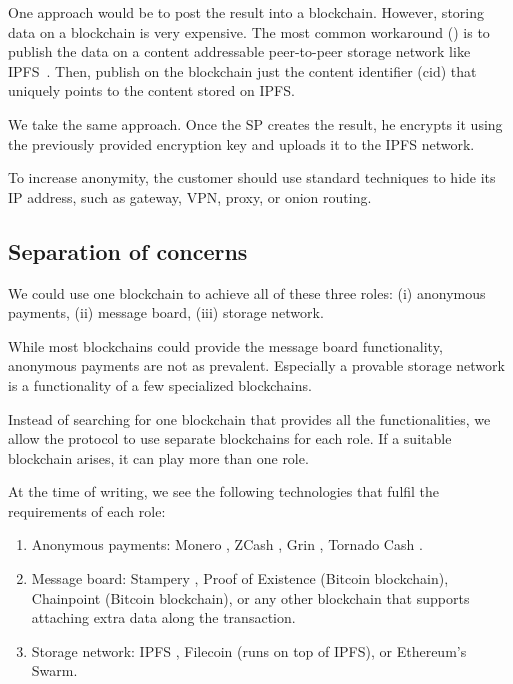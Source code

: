 \documentclass{ieeeaccess}
\begin{document}
One approach would be to post the result into a blockchain. However, storing data on a blockchain is very expensive. The most common workaround (\cite{shahidBlockchainBasedAgriFoodSupply2020, wangAuditableProtocolsFair2019, chenImprovedP2PFile2017}) is to publish the data on a content addressable peer-to-peer storage network like IPFS~\cite{benetIPFSContentAddressed2014}. Then, publish on the blockchain just the content identifier ($\mathrm{cid}$) that uniquely points to the content stored on IPFS.

We take the same approach. Once the SP creates the result, he encrypts it using the previously provided encryption key and uploads it to the IPFS network.

To increase anonymity, the customer should use standard techniques to hide its IP address, such as gateway, VPN, proxy, or onion routing.

\subsection{Separation of concerns}
We could use one blockchain to achieve all of these three roles: (i) anonymous payments, (ii) message board, (iii) storage network.

While most blockchains could provide the message board functionality, anonymous payments are not as prevalent. Especially a provable storage network is a functionality of a few specialized blockchains.

Instead of searching for one blockchain that provides all the functionalities, we allow the protocol to use separate blockchains for each role. If a suitable blockchain arises, it can play more than one role.

At the time of writing, we see the following technologies that fulfil the requirements of each role:

\begin{enumerate}
\def\labelenumi{\arabic{enumi}.}

\item Anonymous payments: Monero \cite{vansaberhagenCryptoNote2013}, ZCash
  \cite{ben-sassonZerocashDecentralizedAnonymous2014}, Grin \cite{fuchsbauerAggregateCashSystems2019},
  Tornado Cash \cite{pertsevTornadoCashPrivacy2019}.
\item Message board: Stampery \cite{crespoStamperyBlockchainTimestamping2017}, Proof of Existence
  \cite{ProofExistenceOnline} (Bitcoin blockchain), Chainpoint
  \cite{ChainpointBlockchainProof} (Bitcoin blockchain), or any other blockchain that
  supports attaching extra data along the transaction.
\item Storage network: IPFS \cite{benetIPFSContentAddressed2014}, Filecoin
  \cite{protocollabsFilecoinDecentralizedStorage2017} (runs on top of IPFS), or Ethereum's
  Swarm\cite{teamSWARMStorageCommunication2021}.
\end{enumerate}
\end{document}
